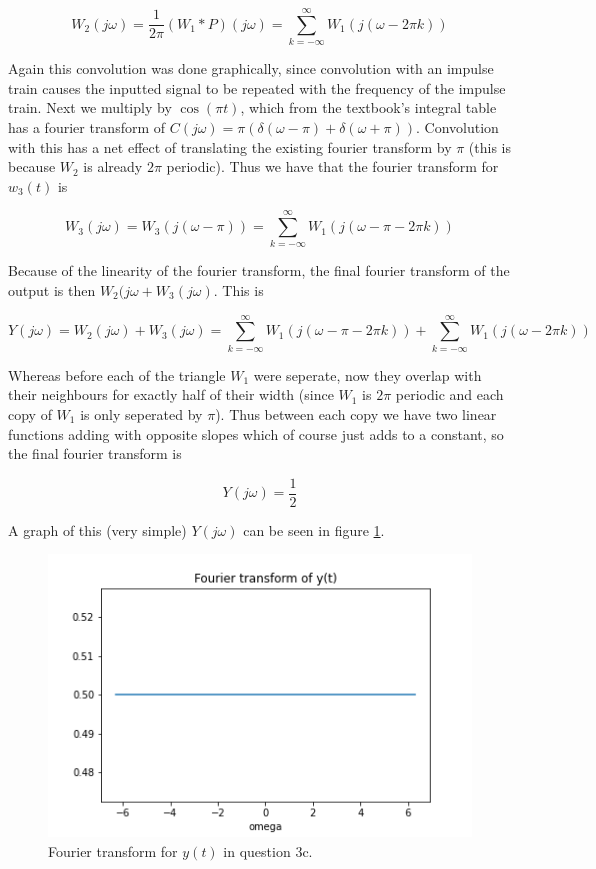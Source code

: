 \documentclass[letterpaper, reqno,11pt]{article}
\begin{document}
\[
    W_2(j\omega) = \frac1{2\pi}(W_1*P)(j\omega)=\sum_{k=-\infty}^\infty W_1(j(\omega-2\pi k))
\]

Again this convolution was done graphically, since convolution with an impulse train causes the inputted signal to be repeated with the frequency of the impulse train. Next we multiply by $\cos(\pi t)$, which from the textbook's integral table has a fourier transform of $C(j\omega)=\pi(\delta(\omega-\pi)+\delta(\omega+\pi))$. Convolution with this has a net effect of translating the existing fourier transform by $\pi$ (this is because $W_2$ is already $2\pi$ periodic). Thus we have that the fourier transform for $w_3(t)$ is 

\[
    W_3(j\omega)=W_3(j(\omega-\pi))=\sum_{k=-\infty}^\infty W_1(j(\omega-\pi-2\pi k))
\]

Because of the linearity of the fourier transform, the final fourier transform of the output is then $W_2(j\omega+W_3(j\omega)$. This is 

\[
    Y(j\omega)=W_2(j\omega)+W_3(j\omega)=\sum_{k=-\infty}^\infty W_1(j(\omega-\pi-2\pi k))+\sum_{k=-\infty}^\infty W_1(j(\omega-2\pi k))
\]

Whereas before each of the triangle $W_1$ were seperate, now they overlap with their neighbours for exactly half of their width (since $W_1$ is $2\pi$ periodic and each copy of $W_1$ is only seperated by $\pi$). Thus between each copy we have two linear functions adding with opposite slopes which of course just adds to a constant, so the final fourier transform is 

\[
    Y(j\omega) = \frac12
\]

A graph of this (very simple) $Y(j\omega)$ can be seen in figure \ref{fig:q3c}. 

\begin{figure}[htbp]
\centering
\includegraphics[width=\textwidth]{q3c}
\caption{Fourier transform for $y(t)$ in question 3c. }
\label{fig:q3c}
\end{figure}
\end{document}
